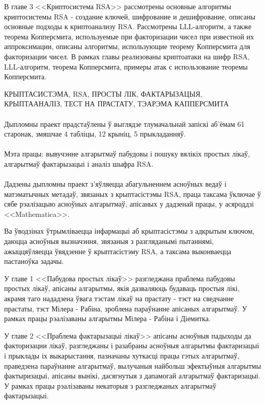 	В главе 3 <<Криптосистема RSA>> рассмотрены основные алгоритмы криптосистемы RSA - создание ключей, шифрование и дешифрование, описаны основные
	подходы к криптоанализу RSA. Рассмотрены LLL-алгоритм, а также теорема Копперсмита, используемые при факторизации чисел при известной их 
	аппроксимации, описаны алгоритмы, использующие теорему Копперсмита для факторизации чисел. В рамках главы реализованы криптоатаки на шифр RSA, LLL-алгоритм, теорема 
	Копперсмита, примеры атак с использование теоремы Копперсмита.

\newpage

КРЫПТАСИСТЭМА, RSA, ПРОСТЫ ЛIК, ФАКТАРЫЗАЦЫЯ, КРЫПТААНАЛIЗ, ТЕСТ НА ПРАСТАТУ, ТЭАРЭМА КАППЕРСМИТА

\paragraph{} Дыпломны праект прадстаўлены ў выглядзе тлумачальнай запіскі аб'ёмам 61 старонак, змяшчае 4 табліцы, 12 крыніц, 5 прыкладанняў.

\paragraph{} Мэта працы: вывучэнне алгарытмаў пабудовы і пошуку вялікіх простых лікаў, алгарытмаў фактарызацыі і аналіз шыфра RSA.

\paragraph{} Дадзены дыпломны праект з'яўляецца абагульненнем асноўных ведаў і матэматычных метадаў, звязаных з крыптасістэмы RSA, праца таксама
ўключае ў сябе рэалізацыю асноўных алгарытмаў, апісаных у дадзенай працы, у асяроддзі <<Mathematica>>.

Ва ўводзінах ўтрымліваецца інфармацыі аб крыптасістэмы з адкрытым ключом, даюцца асноўныя вызначэння, звязаныя з разгляданымі пытаннямі,
ажыццяўляецца ўвядзенне ў крыптасістэму RSA, а таксама выконваецца пастаноўка задачы.

У главе 1 <<Пабудова простых лікаў>> разгледжана праблема пабудовы простых лікаў, апісаны алгарытмы, якія дазваляюць будаваць простыя лікі,
акрамя таго нададзена ўвага тэстам лікаў на прастату - тэст на сведчанне прастаты, тэст Мілера - Рабіна, зроблена параўнанне апісаных алгарытмаў. У рамках
працы рэалізаваны алгарытмы Мілера - Рабіна і Діемитка.

У главе 2 <<Праблема фактарызацыі лікаў>> апісаны асноўныя падыходы да факторизации лікаў, разгледжаны і разабраны асноўныя алгарытмы фактаризацыі і прыклады іх выкарыстання, пазначаны хуткасці працы гэтых алгарытмаў, праведзена параўнанне алгарытмаў, вылучаныя найбольш эфектыўныя алгарытмы фактыризацыі, апісаны вынікі, дасягнутыя з дапамогай алгарытмаў фактаризацыі. У рамках працы рэалізаваны некаторыя з разгледжаных алгарытмаў фактарызацыі.

